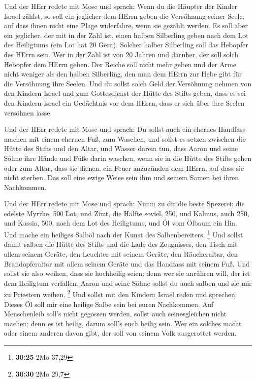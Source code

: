  Und der HErr redete mit Mose und sprach: 
Wenn du die Häupter der Kinder Israel zählst, so soll ein jeglicher dem
HErrn geben die Versöhnung seiner Seele, auf dass ihnen nicht eine Plage
widerfahre, wenn sie gezählt werden.  Es soll aber ein
jeglicher, der mit in der Zahl ist, einen halben Silberling geben nach
dem Lot des Heiligtums (ein Lot hat 20 Gera). Solcher halber Silberling
soll das Hebopfer des HErrn sein.  Wer in der Zahl ist von
20 Jahren und darüber, der soll solch Hebopfer dem HErrn geben.
 Der Reiche soll nicht mehr geben und der Arme nicht
weniger als den halben Silberling, den man dem HErrn zur Hebe gibt für
die Versöhnung ihre Seelen.  Und du sollst solch Geld der
Versöhnung nehmen von den Kindern Israel und zum Gottesdienst der Hütte
des Stifts geben, dass es sei den Kindern Israel ein Gedächtnis vor dem
HErrn, dass er sich über ihre Seelen versöhnen lasse.

 Und der HErr redete mit Mose und sprach:  Du
sollst auch ein ehernes Handfass machen mit einem ehernen Fuß, zum
Waschen, und sollst es setzen zwischen die Hütte des Stifts und den
Altar, und Wasser darein tun,  dass Aaron und seine Söhne
ihre Hände und Füße darin waschen,  wenn sie in die Hütte
des Stifts gehen oder zum Altar, dass sie dienen, ein Feuer anzuzünden
dem HErrn,  auf dass sie nicht sterben. Das soll eine ewige
Weise sein ihm und seinem Samen bei ihren Nachkommen.

 Und der HErr redete mit Mose und sprach: 
Nimm zu dir die beste Spezerei: die edelste Myrrhe, 500 Lot, und Zimt,
die Hälfte soviel, 250, und Kalmus, auch 250,  und Kassia,
500, nach dem Lot des Heiligtums, und Öl vom Ölbaum ein Hin.
 Und mache ein heiliges Salböl nach der Kunst des
Salbenbereiters. \footnote{\textbf{30:25} 2Mo 37,29}  Und
sollst damit salben die Hütte des Stifts und die Lade des Zeugnisses,
 den Tisch mit allem seinem Geräte, den Leuchter mit seinem
Geräte, den Räucheraltar,  den Brandopferaltar mit allem
seinem Geräte und das Handfass mit seinem Fuß.  Und sollst
sie also weihen, dass sie hochheilig seien; denn wer sie anrühren will,
der ist dem Heiligtum verfallen.  Aaron und seine Söhne
sollst du auch salben und sie mir zu Priestern weihen. \footnote{\textbf{30:30}
  2Mo 29,7}  Und sollst mit den Kindern Israel reden und
sprechen: Dieses Öl soll mir eine heilige Salbe sein bei euren
Nachkommen.  Auf Menschenleib soll's nicht gegossen werden,
sollst auch seinesgleichen nicht machen; denn es ist heilig, darum
soll's euch heilig sein.  Wer ein solches macht oder einem
anderen davon gibt, der soll von seinem Volk ausgerottet werden.

